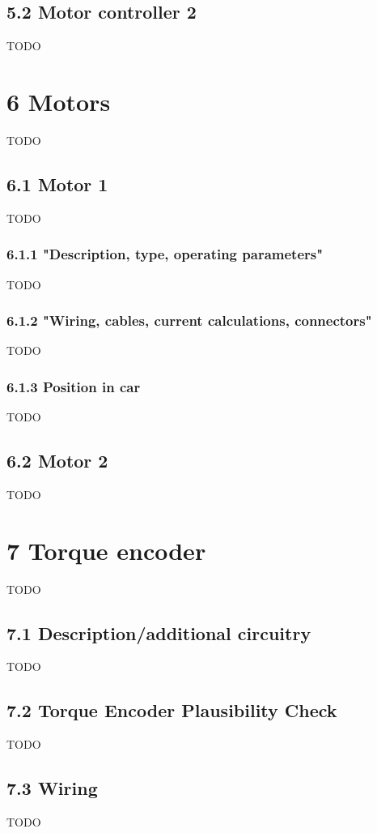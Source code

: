 \documentclass{article}
\begin{document}
\subsection*{5.2 Motor controller 2}
TODO

\section*{6 Motors}
TODO

\subsection*{6.1 Motor 1}
TODO

\subsubsection*{6.1.1 "Description, type, operating parameters"}
TODO

\subsubsection*{6.1.2 "Wiring, cables, current calculations, connectors"}
TODO

\subsubsection*{6.1.3 Position in car}
TODO

\subsection*{6.2 Motor 2}
TODO

\section*{7 Torque encoder}
TODO

\subsection*{7.1 Description/additional circuitry}
TODO

\subsection*{7.2 Torque Encoder Plausibility Check}
TODO

\subsection*{7.3 Wiring}
TODO
\end{document}
